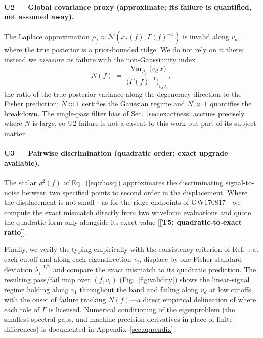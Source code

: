 \documentclass[twocolumn,prd,showpacs,superscriptaddress]{revtex4-2}
\newcommand{\Var}{\operatorname{Var}}
\newcommand{\vd}{v_{d}}          %
\newcommand{\rhosq}{\rho^{2}}    %
\newcommand{\manifest}[1]{\textbf{[#1]}}
\newcommand{\figref}[1]{Fig.~\ref{fig:#1}}
\newcommand{\secref}[1]{Sec.~\ref{sec:#1}}
\newcommand{\eqnref}[1]{Eq.~(\ref{eq:#1})}
\begin{document}
\paragraph{U2 --- Global covariance proxy (approximate; its failure is quantified, not assumed away).}
The Laplace approximation $\rho_f \approx \mathcal{N}(x_{*}(f), \Gamma(f)^{-1})$ is invalid along $\vd$, where the true posterior is a prior-bounded ridge. We do not rely on it there; instead we \emph{measure} its failure with the non-Gaussianity index
\begin{equation}
N(f) \;=\;
\frac{\Var_{\rho_f}\!\bigl(\vd^{\top} x\bigr)}
{\bigl(\Gamma(f)^{-1}\bigr)_{\vd\vd}} ,
\label{eq:ngauss}
\end{equation}
the ratio of the true posterior variance along the degeneracy direction to the Fisher prediction; $N \approx 1$ certifies the Gaussian regime and $N \gg 1$ quantifies the breakdown. The single-pass filter bias of \secref{exactness} accrues precisely where $N$ is large, so U2 failure is not a caveat to this work but part of its subject matter.

\paragraph{U3 --- Pairwise discrimination (quadratic order; exact upgrade available).}
The scalar $\rhosq(f)$ of \eqnref{rhosq} approximates the discriminating signal-to-noise between two specified points to second order in the displacement. Where the displacement is not small---as for the ridge endpoints of GW170817---we compute the exact mismatch directly from two waveform evaluations and quote the quadratic form only alongside its exact value [\manifest{T5: quadratic-to-exact ratio}].

Finally, we verify the typing empirically with the consistency criterion of Ref.~\cite{vallisneri2008fisher}: at each cutoff and along each eigendirection $v_i$, displace by one Fisher standard deviation $\lambda_i^{-1/2}$ and compare the exact mismatch to its quadratic prediction. The resulting pass/fail map over $(f, v_i)$ (\figref{validity}) shows the linear-signal regime holding along $v_1$ throughout the band and failing along $\vd$ at low cutoffs, with the onset of failure tracking $N(f)$---a direct empirical delineation of where each role of $\Gamma$ is licensed. Numerical conditioning of the eigenproblem (the smallest spectral gaps, and machine-precision derivatives in place of finite differences) is documented in Appendix~\ref{sec:appendix}.
\end{document}
